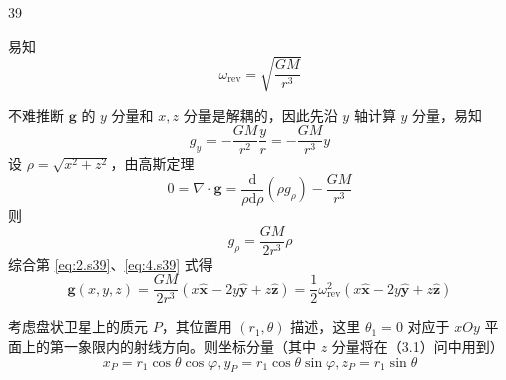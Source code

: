 \begin{solution}{39}
    \begin{subsolution}
        易知
        \begin{equation}
            \omega_ {\mathrm{rev}} = \sqrt {\frac {G M}{r ^ {3}}}
            \label{eq:1.s39}
        \end{equation}
    \end{subsolution}
    \begin{subsolution}
        \begin{subsubsolution}
            不难推断 $\pmb{g}$ 的 $y$ 分量和 $x, z$ 分量是解耦的，因此先沿 $y$ 轴计算 $y$ 分量，易知
            \begin{equation}
                g _ {y} = - \frac {G M}{r ^ {2}} \frac {y}{r} = - \frac {G M}{r ^ {3}} y
                \label{eq:2.s39}
            \end{equation}
            设 $\rho = \sqrt{x^2 + z^2}$，由高斯定理
            \begin{equation}
                0 = \nabla \cdot \pmb {g} = \frac {\mathrm{d}}{\rho \mathrm{d} \rho} (\rho g _ {\rho}) - \frac {G M}{r ^ {3}}
                \label{eq:3.s39}
            \end{equation}
            则
            \begin{equation}
                g _ {\rho} = \frac {G M}{2 r ^ {3}} \rho
                \label{eq:4.s39}
            \end{equation}
            综合第 \eqref{eq:2.s39}、\eqref{eq:4.s39} 式得
            \begin{equation}
                \boldsymbol {g} (x, y, z) = \frac {G M}{2 r ^ {3}} \left(x \hat {\boldsymbol {x}} - 2 y \hat {\boldsymbol {y}} + z \hat {\boldsymbol {z}}\right) = \frac {1}{2} \omega_ {\text {rev}} ^ {2} \left(x \hat {\boldsymbol {x}} - 2 y \hat {\boldsymbol {y}} + z \hat {\boldsymbol {z}}\right)
                \label{eq:5.s39}
            \end{equation}
        \end{subsubsolution}
        \begin{subsubsolution}
            考虑盘状卫星上的质元 $P$，其位置用 $(r_1,\theta)$ 描述，这里 $\theta_{1} = 0$ 对应于 $xOy$ 平面上的第一象限内的射线方向。则坐标分量（其中 $z$ 分量将在（3.1）问中用到）
            \begin{equation}
                x _ {P} = r _ {1} \cos \theta \cos \varphi , y _ {P} = r _ {1} \cos \theta \sin \varphi , z _ {P} = r _ {1} \sin \theta
                \label{eq:6.s39}
            \end{equation}

\end{subsubsolution}
\end{subsolution}
\end{solution}
